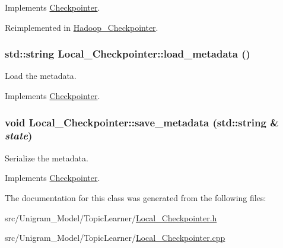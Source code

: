 Implements \hyperlink{class_checkpointer_a7a0f2b3220292d7a3be972776ea8f2d3}{Checkpointer}.



Reimplemented in \hyperlink{class_hadoop___checkpointer_acf19b7cb85d84a51584bd06de37e8fee}{Hadoop\_\-Checkpointer}.

\hypertarget{class_local___checkpointer_a3a2bdc4e2afa1434605c69c3f46db69f}{
\subsubsection[{load\_\-metadata}]{\setlength{\rightskip}{0pt plus 5cm}std::string Local\_\-Checkpointer::load\_\-metadata ()}}
\label{class_local___checkpointer_a3a2bdc4e2afa1434605c69c3f46db69f}


Load the metadata. 



Implements \hyperlink{class_checkpointer_ab3823bbe8bab653084697af29296323d}{Checkpointer}.

\hypertarget{class_local___checkpointer_a9539be451ec14462873da2658e3ead80}{
\subsubsection[{save\_\-metadata}]{\setlength{\rightskip}{0pt plus 5cm}void Local\_\-Checkpointer::save\_\-metadata (std::string \& {\em state})}}
\label{class_local___checkpointer_a9539be451ec14462873da2658e3ead80}


Serialize the metadata. 



Implements \hyperlink{class_checkpointer_a2dd3cfe87847c8e3d1dac001c8d75a8c}{Checkpointer}.



The documentation for this class was generated from the following files:\begin{DoxyCompactItemize}
\item 
src/Unigram\_\-Model/TopicLearner/\hyperlink{_local___checkpointer_8h}{Local\_\-Checkpointer.h}\item 
src/Unigram\_\-Model/TopicLearner/\hyperlink{_local___checkpointer_8cpp}{Local\_\-Checkpointer.cpp}\end{DoxyCompactItemize}
